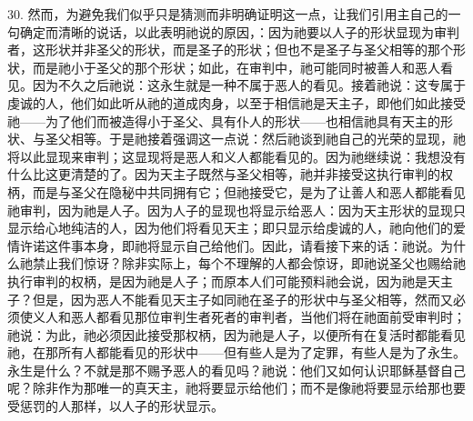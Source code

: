 30. 然而，为避免我们似乎只是猜测而非明确证明这一点，让我们引用主自己的一句确定而清晰的说话，以此表明祂说的原因，：因为祂要以人子的形状显现为审判者，这形状并非圣父的形状，而是圣子的形状；但也不是圣子与圣父相等的那个形状，而是祂小于圣父的那个形状；如此，在审判中，祂可能同时被善人和恶人看见。因为不久之后祂说：这永生就是一种不属于恶人的看见。接着祂说：这专属于虔诚的人，他们如此听从祂的道成肉身，以至于相信祂是天主子，即他们如此接受祂——为了他们而被造得小于圣父、具有仆人的形状——也相信祂具有天主的形状、与圣父相等。于是祂接着强调这一点说：然后祂谈到祂自己的光荣的显现，祂将以此显现来审判；这显现将是恶人和义人都能看见的。因为祂继续说：我想没有什么比这更清楚的了。因为天主子既然与圣父相等，祂并非接受这执行审判的权柄，而是与圣父在隐秘中共同拥有它；但祂接受它，是为了让善人和恶人都能看见祂审判，因为祂是人子。因为人子的显现也将显示给恶人：因为天主形状的显现只显示给心地纯洁的人，因为他们将看见天主；即只显示给虔诚的人，祂向他们的爱情许诺这件事本身，即祂将显示自己给他们。因此，请看接下来的话：祂说。为什么祂禁止我们惊讶？除非实际上，每个不理解的人都会惊讶，即祂说圣父也赐给祂执行审判的权柄，是因为祂是人子；而原本人们可能预料祂会说，因为祂是天主子？但是，因为恶人不能看见天主子如同祂在圣子的形状中与圣父相等，然而又必须使义人和恶人都看见那位审判生者死者的审判者，当他们将在祂面前受审判时；祂说：为此，祂必须因此接受那权柄，因为祂是人子，以便所有在复活时都能看见祂，在那所有人都能看见的形状中——但有些人是为了定罪，有些人是为了永生。永生是什么？不就是那不赐予恶人的看见吗？祂说：他们又如何认识耶稣基督自己呢？除非作为那唯一的真天主，祂将要显示给他们；而不是像祂将要显示给那也要受惩罚的人那样，以人子的形状显示。\par

